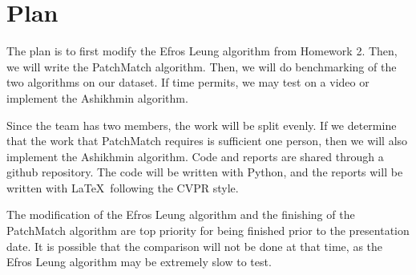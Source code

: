 \section{Plan}

The plan is to first modify the Efros Leung algorithm from Homework 2. Then, we will write the PatchMatch algorithm. Then, we will do benchmarking of the two algorithms on our dataset. If time permits, we may test on a video or implement the Ashikhmin algorithm.

Since the team has two members, the work will be split evenly. If we determine that the work that PatchMatch requires is sufficient one person, then we will also implement the Ashikhmin algorithm. Code and reports are shared through a github repository. The code will be written with Python, and the reports will be written with \LaTeX~following the CVPR style.

The modification of the Efros Leung algorithm and the finishing of the PatchMatch algorithm are top priority for being finished prior to the presentation date. It is possible that the comparison will not be done at that time, as the Efros Leung algorithm may be extremely slow to test.